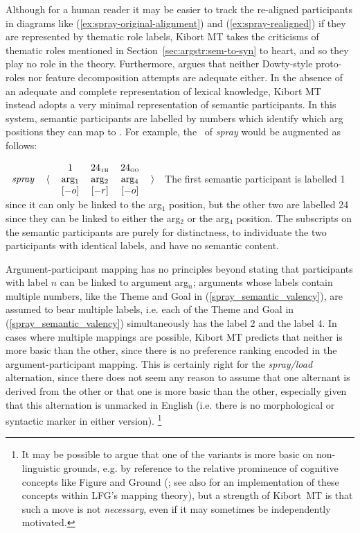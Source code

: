 \documentclass[output=paper]{langscibook}
\begin{document}
Although for a human reader it may be easier to track the re-aligned
participants in diagrams like (\ref{ex:spray-original-alignment}) and
(\ref{ex:spray-realigned}) if they are represented by thematic role labels,
Kibort MT takes the criticisms of thematic roles mentioned in
Section~\ref{sec:argstr:sem-to-syn} to heart, and so they play no role in the theory.
Furthermore, \citet{kibort14} argues that neither Dowty-style proto-roles nor
feature decomposition attempts are adequate either. In the absence of an
adequate and complete representation of lexical knowledge, Kibort MT instead
adopts a very minimal representation of semantic participants. In this system,
semantic participants are labelled by numbers which identify which arg positions
they can map to \citep[275ff.]{kibort14}. For example, the \astruc\ of
\textit{spray} would be augmented as follows:

\ea\label{spray_semantic_valency}
\ensuremath{%
  \begin{tabular}[c]{lrcccl}
    && 1 & 24$_\textsc{th}$ & 24$_\textsc{go}$ \\
    \textit{spray}   &    $\langle$  & arg$_{1}$ & arg$_{2}$ & arg$_{4}$  & $\rangle$ \\
    & & $[-o]$ & $[-r]$ & $[-o]$
\end{tabular}
}
\z
%
The first semantic participant is labelled 1 since it can only be linked to the
arg$_{1}$ position, but the other two are labelled 24 since they can be linked
to either the arg$_{2}$ or the arg$_{4}$ position. The subscripts on the
semantic participants are purely for distinctness, to individuate the two
participants with identical labels, and have no semantic content.

Argument-participant mapping has no principles beyond stating that participants with label $n$ can be linked to argument arg$_{n}$; arguments whose labels contain multiple numbers, like the Theme and Goal in (\ref{spray_semantic_valency}), are assumed to bear multiple labels, i.e. each of the Theme and Goal in (\ref{spray_semantic_valency}) simultaneously has the label 2 and the label 4. In cases where multiple mappings are possible, Kibort MT predicts that neither is more basic than the other, since there is no preference ranking encoded in the argument-participant mapping. This is certainly right for the \textit{spray\slash load} alternation, since there does not seem any reason to assume that one alternant is derived from the other or that one is more basic than the other, especially given that this alternation is unmarked in English (i.e. there is no morphological or syntactic marker in either version).%
%
\footnote{It may be possible to argue that one of the variants is more basic on
  non-linguistic grounds, e.g. by reference to the relative prominence of
  cognitive concepts like Figure and Ground (\citealp{talmy78}; see also
  \citealt{schaetzle18} for an implementation of these concepts within LFG's
  mapping theory), but a strength of Kibort~MT is that such a move is not
  \emph{necessary}, even if it may sometimes be independently motivated.}
%
\end{document}
